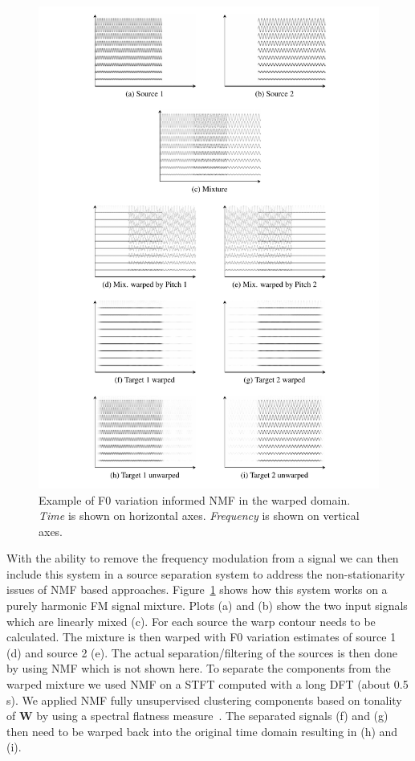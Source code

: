 \begin{figure}
  \includegraphics[width=\textwidth]{Chapters/05_Separation_Known/figures/toy.pdf}
\caption{Example of F0 variation informed NMF in the warped domain. \textit{Time} is shown on horizontal axes. \textit{Frequency} is shown on vertical axes.}%
\label{fig:warpingdemo}
\end{figure}

With the ability to remove the frequency modulation from a signal we can then include this system in a source separation system to address the non-stationarity issues of NMF based approaches. 
Figure~\ref{fig:warpingdemo} shows how this system works on a purely harmonic FM signal mixture. 
Plots (a) and (b) show the two input signals which are linearly mixed (c). 
For each source the warp contour needs to be calculated. 
The mixture is then warped with F0 variation estimates of source 1 (d) and source 2 (e). 
The actual separation/filtering of the sources is then done by using NMF which is not shown here. 
To separate the components from the warped mixture we used NMF on a STFT computed with a long DFT (about 0.5 s). 
We applied NMF fully unsupervised clustering components based on tonality of $\textbf{W}$ by using a spectral flatness measure~\cite{gray74}. The separated signals (f) and (g) then need to be warped back into the original time domain resulting in (h) and (i).

